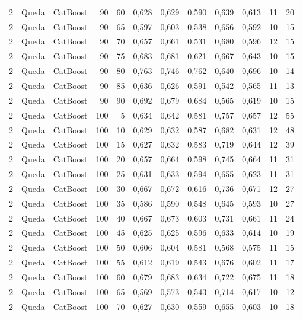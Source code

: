 \begin{longtable}{@{}rllrrrrrrrrr@{}}
2 & Queda & CatBoost & 90 & 60 & 0,628 & 0,629 & 0,590 & 0,639 & 0,613 & 11 & 20 \\
2 & Queda & CatBoost & 90 & 65 & 0,597 & 0,603 & 0,538 & 0,656 & 0,592 & 10 & 15 \\
2 & Queda & CatBoost & 90 & 70 & 0,657 & 0,661 & 0,531 & 0,680 & 0,596 & 12 & 15 \\
2 & Queda & CatBoost & 90 & 75 & 0,683 & 0,681 & 0,621 & 0,667 & 0,643 & 10 & 15 \\
2 & Queda & CatBoost & 90 & 80 & 0,763 & 0,746 & 0,762 & 0,640 & 0,696 & 10 & 14 \\
2 & Queda & CatBoost & 90 & 85 & 0,636 & 0,626 & 0,591 & 0,542 & 0,565 & 11 & 13 \\
2 & Queda & CatBoost & 90 & 90 & 0,692 & 0,679 & 0,684 & 0,565 & 0,619 & 10 & 15 \\
2 & Queda & CatBoost & 100 & 5 & 0,634 & 0,642 & 0,581 & 0,757 & 0,657 & 12 & 55 \\
2 & Queda & CatBoost & 100 & 10 & 0,629 & 0,632 & 0,587 & 0,682 & 0,631 & 12 & 48 \\
2 & Queda & CatBoost & 100 & 15 & 0,627 & 0,632 & 0,583 & 0,719 & 0,644 & 12 & 39 \\
2 & Queda & CatBoost & 100 & 20 & 0,657 & 0,664 & 0,598 & 0,745 & 0,664 & 11 & 31 \\
2 & Queda & CatBoost & 100 & 25 & 0,631 & 0,633 & 0,594 & 0,655 & 0,623 & 11 & 31 \\
2 & Queda & CatBoost & 100 & 30 & 0,667 & 0,672 & 0,616 & 0,736 & 0,671 & 12 & 27 \\
2 & Queda & CatBoost & 100 & 35 & 0,586 & 0,590 & 0,548 & 0,645 & 0,593 & 10 & 27 \\
2 & Queda & CatBoost & 100 & 40 & 0,667 & 0,673 & 0,603 & 0,731 & 0,661 & 11 & 24 \\
2 & Queda & CatBoost & 100 & 45 & 0,625 & 0,625 & 0,596 & 0,633 & 0,614 & 10 & 19 \\
2 & Queda & CatBoost & 100 & 50 & 0,606 & 0,604 & 0,581 & 0,568 & 0,575 & 11 & 15 \\
2 & Queda & CatBoost & 100 & 55 & 0,612 & 0,619 & 0,543 & 0,676 & 0,602 & 11 & 17 \\
2 & Queda & CatBoost & 100 & 60 & 0,679 & 0,683 & 0,634 & 0,722 & 0,675 & 11 & 18 \\
2 & Queda & CatBoost & 100 & 65 & 0,569 & 0,573 & 0,543 & 0,714 & 0,617 & 10 & 12 \\
2 & Queda & CatBoost & 100 & 70 & 0,627 & 0,630 & 0,559 & 0,655 & 0,603 & 10 & 18 \\

\end{longtable}
